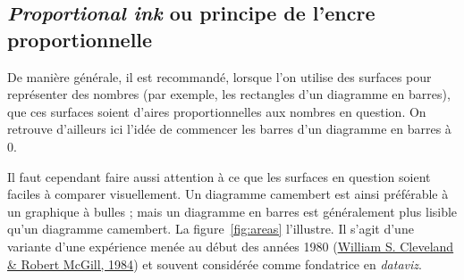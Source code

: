 \subsection{\textit{Proportional ink} ou principe de l'encre proportionnelle}
De manière générale, il est recommandé, lorsque l'on utilise des surfaces pour
représenter des nombres (par exemple, les rectangles d'un diagramme en barres),
que ces surfaces soient d'aires pro\-por\-tion\-nel\-les aux nombres en question. On
retrouve d'ailleurs ici l'idée de commencer les barres d'un diagramme en
barres à 0.

Il faut cependant faire aussi attention à ce que les surfaces en question
soient faciles à comparer visuellement. Un diagramme camembert est ainsi
préférable à un graphique à bulles ; mais un diagramme en barres est
généralement plus lisible qu'un diagramme camembert. La figure~\ref{fig:areas}
l'illustre. Il s'agit d'une variante d'une
expérience
  menée au début des années 1980 (\href{https://www.jstor.org/stable/2288400}{William S. Cleveland \& Robert McGill, 1984}) et souvent considérée comme fondatrice en
\textit{dataviz}.

